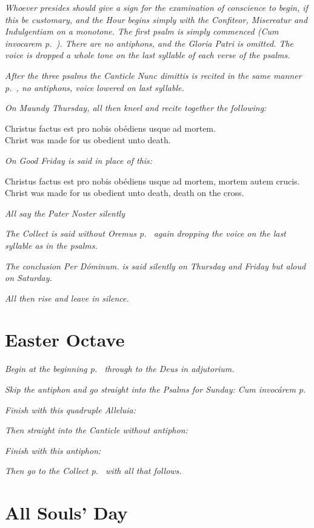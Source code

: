 \documentclass[a5paper,11pt,twoside,openany]{memoir}
\def\latin#1{\selectlanguage{latin}#1\selectlanguage{british}\\}
\def\vern#1{{\inglesh \fontsize{14}{11}\selectfont #1}\par}
\def\startParallel{}
\def\stopParallel{}
\newcommand\rubrics[1]{\textit{#1}}
\begin{document}
\rubrics{Whoever presides should give a sign for the examination of conscience to begin, if this be customary, and the Hour begins simply with the Confiteor, Misereatur and Indulgentiam on a monotone.  The first psalm is simply commenced (Cum invocarem p.~\pageref{sunday}). There are no antiphons, and the Gloria Patri is omitted.  The voice is dropped a whole tone on the last syllable of each verse of the psalms.}

\rubrics{After the three psalms the Canticle Nunc dimittis is recited in the same manner p.~\pageref{canticle}, no antiphons, voice lowered on last syllable.}

\rubrics{On Maundy Thursday, all then kneel and recite together the following: }

\startParallel
\latin{Christus factus est pro nobis obédiens usque ad mortem.}
\vern{Christ was made for us obedient unto death.}
\stopParallel

\rubrics{On Good Friday is said in place of this:}

\startParallel
\latin{Christus factus est pro nobis obédiens usque ad mortem, mortem autem crucis.}
\vern{Christ was made for us obedient unto death, death on the cross.}
\stopParallel

\rubrics{All say the Pater Noster silently}

\rubrics{The Collect is said without Oremus p.~\pageref{collect} again dropping the voice on the last syllable as in the psalms.}

\rubrics{The conclusion \emph{Per Dóminum.} is said silently on Thursday and Friday but aloud on Saturday.}

\rubrics{All then rise and leave in silence.}

\chapter{Easter Octave}

\rubrics{Begin at the beginning p.~\pageref{beginning} through to the Deus in adjutorium.}

\rubrics{Skip the antiphon and go straight into the Psalms for Sunday: Cum invocárem p.~\pageref{sunday}}

\rubrics{Finish with this quadruple Alleluia:}


\rubrics{Then straight into the Canticle without antiphon:}


\rubrics{Finish with this antiphon:}


\rubrics{Then go to the Collect p.~\pageref{collect} with all that follows.}


\chapter{All Souls' Day}
\end{document}
